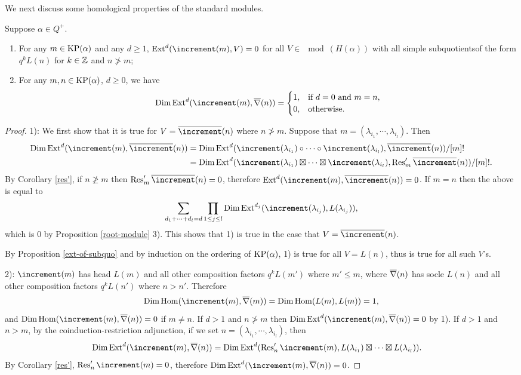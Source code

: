 We next discuss some homological properties of the standard modules.

\begin{proposition}\label{homological-property}
    Suppose $\alpha\in Q^+$.
    \begin{enumerate}[1)]
        \item For any $m\in\operatorname{KP}(\alpha)$ and any $d\ge 1$,
        $\Ext^d(\std(m),V) = 0$ for all $V\in\mod(H(\alpha))$
        with all simple subquotientsof the form $q^kL(n)$
        for $k\in\mathbb{Z}$ and $n\not>m$;
        \item For any $m,n\in\operatorname{KP}(\alpha)$, $d\ge 0$, we have $$
        \Dim\Ext^d(\std(m),\pcostd(n)) = \begin{cases}
            1,&\text{if }d = 0\text{ and }m = n,\\
            0,&\text{otherwise}.
        \end{cases}$$
    \end{enumerate}
\end{proposition}

\begin{proof}
    1): We first show that it is true for $V = \pstd(n)$
    where $n\not>m$. Suppose that $m = (\lambda_{i_1},\cdots,
    \lambda_{i_l})$. Then $$\begin{aligned}
        \Dim\Ext^d(\std(m),\pstd(n))& = \Dim\Ext^d(\std(\lambda_{i_1})
        \circ\cdots\circ\std(\lambda_{i_l}),\pstd(n))/[m]!\\
        & = \Dim\Ext^d(\std(\lambda_{i_1})
        \ex\cdots\ex\std(\lambda_{i_l}),\Res_m'\pstd(n))/[m]!.
    \end{aligned}$$
    By Corollary \ref{res'}, if $n\not\ge m$ then $\Res_m'\pstd(n) = 0$,
    therefore $\Ext^d(\std(m),\pstd(n)) = 0$. If $m = n$ then 
    the above is equal to $$\sum_{d_1+\cdots+d_l = d}\prod_{1\le j\le l}
    \Dim\Ext^{d_j}(\std(\lambda_{i_j}),L(\lambda_{i_j})),$$ 
    which is $0$ by Proposition \ref{root-module} 3).
    This shows that 1) is true in the case that $V = \pstd(n)$.

    By Proposition \ref{ext-of-subquo} and by induction on the 
    ordering of $\operatorname{KP}(\alpha)$, 1) is true for all $V = L(n)$,
    thus is true for all such $V$'s.

    2): $\std(m)$ has head $L(m)$ and all other composition factors
    $q^k L(m')$ where $m'\le m$, where $\overline{\nabla}(n)$ has socle $L(n)$
    and all other composition factors $q^k L(n')$ where $n>n'$.
    Therefore $$\Dim\Hom(\std(m),\pcostd(m)) = \Dim\Hom(L(m),L(m)) = 1,$$
    and $\Dim\Hom(\std(m),\pcostd(n)) = 0$ if $m\ne n$. If $d>1$ and $n\not>m$
    then $\Dim\Ext^d(\std(m),\pcostd(n)) = 0$ by 1). If $d>1$ and $n>m$,
    by the coinduction-restriction adjunction, if we set
    $n = (\lambda_{i_1},\cdots,\lambda_{i_l})$, then
    \[
    \begin{aligned}
        \Dim\Ext^d(\std(m),\pcostd(n))& = 
        \Dim\Ext^d(\Res_n'\std(m),L(\lambda_{i_1})\ex\cdots\ex L(\lambda_{i_l})).
    \end{aligned}
    \]
    By Corollary \ref{res'}, $\Res_n'\std(m) = 0$, therefore
    $\Dim\Ext^d(\std(m),\pcostd(n)) = 0$.
\end{proof}


